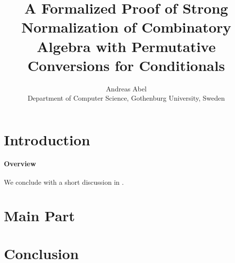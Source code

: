 \documentclass[a4paper]{scrartcl}
\title{A Formalized Proof of Strong Normalization of Combinatory
  Algebra with Permutative Conversions for Conditionals}
\author{Andreas Abel
  \\ Department of Computer Science,
    Gothenburg University,
    Sweden
  }
\begin{document}
\maketitle

\begin{abstract}
\end{abstract}

\section{Introduction}
\label{sec:intro}

\paragraph*{Overview}
%
We conclude with a short discussion in .

\section{Main Part}




\section{Conclusion}
\label{sec:concl}





\end{document}
